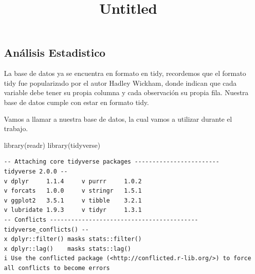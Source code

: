 \documentclass[
  letterpaper,
  DIV=11,
  numbers=noendperiod]{scrartcl}
\title{Untitled}
\author{}
\date{}
\newenvironment{Shaded}{\begin{snugshade}}{\end{snugshade}}
\newcommand{\FunctionTok}[1]{\textcolor[rgb]{0.28,0.35,0.67}{#1}}
\newcommand{\NormalTok}[1]{\textcolor[rgb]{0.00,0.23,0.31}{#1}}
\begin{document}
\maketitle


\subsection{Análisis Estadistico}\label{anuxe1lisis-estadistico}

La base de datos ya se encuentra en formato en tidy, recordemos que el
formato tidy fue popularizado por el autor Hadley Wickham, donde indican
que cada variable debe tener su propia columna y cada observación su
propia fila. Nuestra base de datos cumple con estar en formato tidy.

Vamos a llamar a nuestra base de datos, la cual vamos a utilizar durante
el trabajo.

\begin{Shaded}
\begin{Highlighting}[]
\FunctionTok{library}\NormalTok{(readr)}
\FunctionTok{library}\NormalTok{(tidyverse)}
\end{Highlighting}
\end{Shaded}

\begin{verbatim}
-- Attaching core tidyverse packages ------------------------ tidyverse 2.0.0 --
v dplyr     1.1.4     v purrr     1.0.2
v forcats   1.0.0     v stringr   1.5.1
v ggplot2   3.5.1     v tibble    3.2.1
v lubridate 1.9.3     v tidyr     1.3.1
-- Conflicts ------------------------------------------ tidyverse_conflicts() --
x dplyr::filter() masks stats::filter()
x dplyr::lag()    masks stats::lag()
i Use the conflicted package (<http://conflicted.r-lib.org/>) to force all conflicts to become errors
\end{verbatim}
\end{document}
